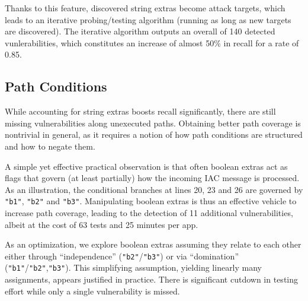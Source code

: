 Thanks to this feature, discovered string extras become attack targets, which leads to an iterative probing/testing algorithm (running as long as new targets are discovered). The iterative algorithm outputs an overall of 140 detected vunlerabilities, which constitutes an increase of almost 50\% in recall for a rate of 0.85.

\subsection{Path Conditions}

While accounting for string extras boosts recall significantly, there are still missing vulnerabilities along unexecuted paths. Obtaining better path coverage is nontrivial in general, as it requires a notion of how path conditions are structured and how to negate them.

A simple yet effective practical observation is that often boolean extras act as flags that govern (at least partially) how the incoming IAC message is processed. As an illustration,
the conditional branches at lines 20, 23 and 26 are governed by {\tt "b1"}, {\tt "b2"} and {\tt "b3"}. Manipulating boolean extras is thus an effective vehicle to increase path coverage, leading to the detection of 11 additional vulnerabilities, albeit at the cost of 63 tests and 25 minutes per app.

As an optimization, we explore boolean extras assuming they relate to each other either through ``independence''
({\tt "b2"}/{\tt "b3"}) or via ``domination'' ({\tt "b1"}/{\tt "b2"},{\tt "b3"}). This simplifying assumption, yielding linearly many assignments, appears justified in practice. There is significant cutdown in testing effort while only a single vulnerability is missed.